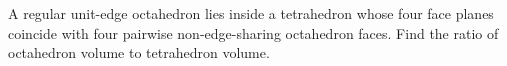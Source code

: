 A regular unit-edge octahedron lies inside a tetrahedron whose four face planes coincide with four pairwise non-edge-sharing octahedron faces. Find the ratio of octahedron volume to tetrahedron volume.
